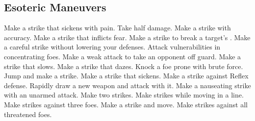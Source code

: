 
\small
\subsection{Esoteric Maneuvers}\label{Esoteric Maneuvers}
\begin{spelllist}
 Make a strike that sickens with pain.
 Take half damage.
 Make a strike with  accuracy.
 Make a strike that inflicts fear.
 Make a strike to break a target's .
 Make a careful strike without lowering your defenses.
 Attack vulnerabilities in concentrating foes.
 Make a weak attack to take an opponent off guard.
 Make a strike that slows.
 Make a strike that dazes.
 Knock a foe prone with brute force.
 Jump and make a strike.
 Make a strike that sickens.
 Make a strike against Reflex defense.
 Rapidly draw a new weapon and attack with it.
 Make a nauseating strike with an unarmed attack.
 Make two strikes.
 Make strikes while moving in a line.
 Make strikes against three foes.
 Make a strike and move.
 Make strikes against all threatened foes.
\end{spelllist}



\small
